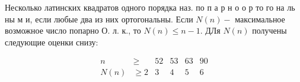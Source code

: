 \documentclass[10pt]{article}
\begin{document}
Несколько латинских квадратов одного порядка наз. по п а р н о о р то го на ль ны м и, если любые два из них ортогональны. Если $N(n)-$ максимальное возможное число попарно О. л. к., то $N(n) \leqslant n-1$. ДЛя $N(n)$ получены следующие оценки снизу:



\[

\begin{array}{rrrrrr}

n & \geqslant & 52 & 53 & 63 & 90 \\

N(n) & \geqslant 2 & 3 & 4 & 5 & 6

\end{array}

\]
\end{document}
